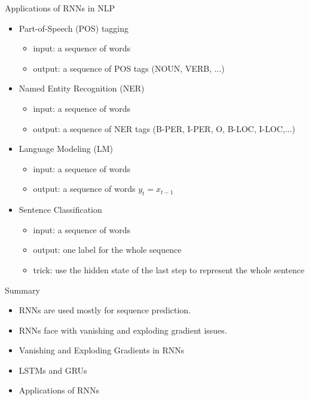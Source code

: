 \documentclass[12pt]{beamer}
\begin{document}
\begin{frame}{Applications of RNNs in NLP}
	\begin{itemize}
		\item Part-of-Speech (POS) tagging
		\begin{itemize}
			\item input: a sequence of words 
			\item output: a sequence of POS tags (NOUN, VERB, ...)
		\end{itemize}
		\item Named Entity Recognition (NER)
		\begin{itemize}
			\item input: a sequence of words 
			\item output: a sequence of NER tags (B-PER, I-PER, O, B-LOC, I-LOC,...)
		\end{itemize}
		\item Language Modeling (LM)
		\begin{itemize}
			\item input: a sequence of words 
			\item output: a sequence of words $y_t = x_{t-1}$
		\end{itemize}
		
		\item Sentence Classification
		\begin{itemize}
			\item input: a sequence of words 
			\item output: one label for the whole sequence
			\item trick: use the hidden state of the last step to represent the whole sentence  
		\end{itemize}
	\end{itemize}
\end{frame}


\begin{frame}{Summary}
	\begin{itemize}
		\item RNNs are used mostly for sequence prediction.
		\item RNNs face with vanishing and exploding gradient issues. 
		\item Vanishing and Exploding Gradients in RNNs
		\item LSTMs and GRUs
		\item Applications of RNNs
	\end{itemize}
\end{frame}
\end{document}
